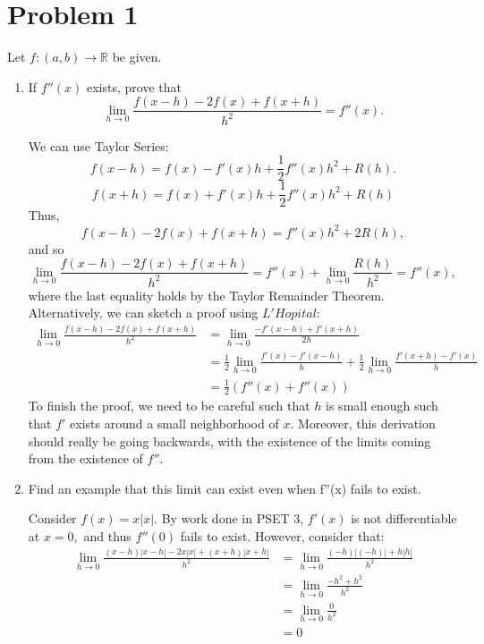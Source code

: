 \documentclass[11pt]{article}
\newcommand{\bbR}{\mathbb{R}}
\begin{document}
	
	
	\psetheader

\section*{Problem 1}
\begin{problem}
Let $f:(a,b)\to \bbR$ be given.
\end{problem}
\begin{enumerate}
    \item 
    \begin{problem}
    If $f''(x)$ exists, prove that 
    \[\lim_{h\to 0}\frac{f(x-h) -2f(x) + f(x+h)}{h^2} = f''(x).\]
    \end{problem}
    \begin{solution}
        We can use Taylor Series:
        \[f(x-h) = f(x) - f'(x)h + \frac{1}{2}f''(x)h^2 + R(h).\]
        \[f(x+h) = f(x) + f'(x)h + \frac{1}{2}f''(x)h^2 + R(h)\]
        Thus, 
        \[f(x-h) - 2f(x) + f(x+h) = f''(x)h^2 + 2R(h),\] and so 
        \[\lim_{h\to 0}\frac{f(x-h) - 2f(x) + f(x+h)}{h^2} = f''(x) + \lim_{h\to 0}\frac{R(h)}{h^2} = f''(x),\] where the last equality holds by the Taylor Remainder Theorem.\\

        Alternatively, we can sketch a proof using $L'Hopital:$
        \begin{align*}
          \lim_{h\to 0}\frac{f(x-h) - 2f(x) + f(x+h)}{h^2} &= \lim_{h\to 0}\frac{-f'(x-h) + f'(x+h)}{2h}\\
          &= \frac{1}{2}\lim_{h\to 0}\frac{f'(x) - f'(x-h)}{h} + \frac{1}{2}\lim_{h\to 0}\frac{f'(x+h) - f'(x)}{h}\\
          &= \frac{1}{2}(f''(x) + f''(x))
        \end{align*}
        To finish the proof, we need to be careful such that $h$ is small enough such that $f'$ exists around a small neighborhood of $x.$ Moreover, this derivation should really be going backwards, with the existence of the limits coming from the existence of $f''.$
    \end{solution}
    \item 
    \begin{problem}
        Find an example that this limit can exist even when f''(x) fails to exist.
    \end{problem}
    \begin{solution}
        Consider $f(x) = x|x|.$ By work done in PSET 3, $f'(x)$ is not differentiable at $x=0,$ and thus $f''(0)$ fails to exist. However, consider that:
        \begin{align*}
          \lim_{h\to 0}\frac{(x-h)|x-h| - 2x|x| + (x+h)|x+h|}{h^2} &=\lim_{h\to 0}\frac{(-h)|(-h)| + h|h|}{h^2}\\
          &= \lim_{h\to 0}\frac{-h^2+ h^2}{h^2} \\
          &= \lim_{h\to 0}\frac{0}{h^2}\\
          &= 0
        \end{align*}
    \end{solution}
\end{enumerate}
\end{document}

